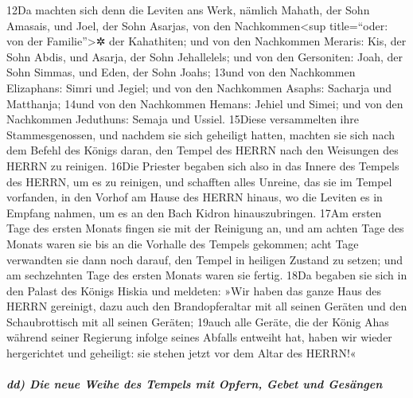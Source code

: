 12Da machten sich denn die Leviten ans Werk, nämlich Mahath, der Sohn
Amasais, und Joel, der Sohn Asarjas, von den Nachkommen\textless sup
title=``oder: von der Familie''\textgreater✲ der Kahathiten; und von den
Nachkommen Meraris: Kis, der Sohn Abdis, und Asarja, der Sohn
Jehallelels; und von den Gersoniten: Joah, der Sohn Simmas, und Eden,
der Sohn Joahs; 13und von den Nachkommen Elizaphans: Simri und Jegiel;
und von den Nachkommen Asaphs: Sacharja und Matthanja; 14und von den
Nachkommen Hemans: Jehiel und Simei; und von den Nachkommen Jeduthuns:
Semaja und Ussiel. 15Diese versammelten ihre Stammesgenossen, und
nachdem sie sich geheiligt hatten, machten sie sich nach dem Befehl des
Königs daran, den Tempel des HERRN nach den Weisungen des HERRN zu
reinigen. 16Die Priester begaben sich also in das Innere des Tempels des
HERRN, um es zu reinigen, und schafften alles Unreine, das sie im Tempel
vorfanden, in den Vorhof am Hause des HERRN hinaus, wo die Leviten es in
Empfang nahmen, um es an den Bach Kidron hinauszubringen. 17Am ersten
Tage des ersten Monats fingen sie mit der Reinigung an, und am achten
Tage des Monats waren sie bis an die Vorhalle des Tempels gekommen; acht
Tage verwandten sie dann noch darauf, den Tempel in heiligen Zustand zu
setzen; und am sechzehnten Tage des ersten Monats waren sie fertig. 18Da
begaben sie sich in den Palast des Königs Hiskia und meldeten: »Wir
haben das ganze Haus des HERRN gereinigt, dazu auch den Brandopferaltar
mit all seinen Geräten und den Schaubrottisch mit all seinen Geräten;
19auch alle Geräte, die der König Ahas während seiner Regierung infolge
seines Abfalls entweiht hat, haben wir wieder hergerichtet und
geheiligt: sie stehen jetzt vor dem Altar des HERRN!«

\hypertarget{dd-die-neue-weihe-des-tempels-mit-opfern-gebet-und-gesuxe4ngen}{%
\subparagraph{dd) Die neue Weihe des Tempels mit Opfern, Gebet und
Gesängen}\label{dd-die-neue-weihe-des-tempels-mit-opfern-gebet-und-gesuxe4ngen}}

